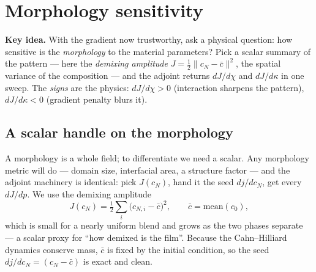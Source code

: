 


\chapter{Morphology sensitivity}
\label{ch:d2}

\begin{keybox}
\textbf{Key idea.} With the gradient now trustworthy, ask a physical
question: how sensitive is the \emph{morphology} to the material
parameters? Pick a scalar summary of the pattern --- here the
\emph{demixing amplitude} $J=\tfrac12\lVert c_N-\bar c\rVert^2$, the
spatial variance of the composition --- and the adjoint returns
$dJ/d\chi$ and $dJ/d\kappa$ in one sweep. The \emph{signs} are the
physics: $dJ/d\chi>0$ (interaction sharpens the pattern),
$dJ/d\kappa<0$ (gradient penalty blurs it).
\end{keybox}

\section{A scalar handle on the morphology}

A morphology is a whole field; to differentiate we need a scalar. Any
morphology metric will do --- domain size, interfacial area, a structure
factor --- and the adjoint machinery is identical: pick $J(c_N)$, hand it
the seed $dj/dc_N$, get every $dJ/dp$. We use the demixing amplitude
%
\begin{equation}
  J(c_N) = \tfrac12\sum_i\big(c_{N,i}-\bar c\big)^2 ,
  \qquad \bar c=\text{mean}(c_0),
  \label{eq:d2J}
\end{equation}
%
which is small for a nearly uniform blend and grows as the two phases
separate --- a scalar proxy for ``how demixed is the film''. Because the
Cahn--Hilliard dynamics conserve mass, $\bar c$ is fixed by the initial
condition, so the seed
$dj/dc_N = (c_N-\bar c)$ is exact and clean.

